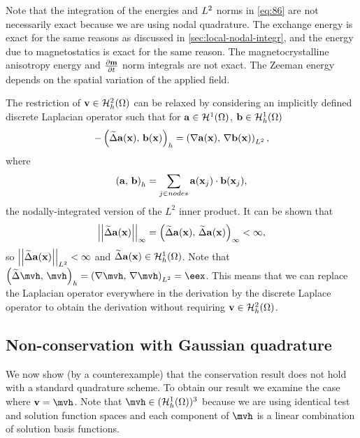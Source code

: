 Note that the integration of the energies and ${L^2}$ norms in \cref{eq:86} are not necessarily exact because we are using nodal quadrature.
The exchange energy is exact for the same reasons as discussed in \cref{sec:local-nodal-integr}, and the energy due to magnetostatics is exact for the same reason.
The magnetocrystalline anisotropy energy and $\frac{\partial \boldsymbol{\mathrm{m}}}{\partial t}$ norm integrals are not exact.
The Zeeman energy depends on the spatial variation of the applied field.

The restriction of $\boldsymbol{\mathrm{v}} \in \mathcal{H}_h^2(\Omega)$ can be relaxed by considering an implicitly defined discrete Laplacian operator such that for ${\boldsymbol{\mathrm{a}}} \in \mathcal{H}^1(\Omega)$, ${\boldsymbol{\mathrm{b}}} \in {\mathcal{H}^1_h(\Omega)}$
\begin{equation}
  -\left(\widetilde{\Delta} {\boldsymbol{\mathrm{a}}}(\boldsymbol{\mathrm{x}}),\, {\boldsymbol{\mathrm{b}}}(\boldsymbol{\mathrm{x}}) \right)_h = \left(\nabla {\boldsymbol{\mathrm{a}}}(\boldsymbol{\mathrm{x}}),\, \nabla {\boldsymbol{\mathrm{b}}}(\boldsymbol{\mathrm{x}}) \right)_{{L^2}},
\end{equation}
where
\begin{equation}
  \left({\boldsymbol{\mathrm{a}}},\, {\boldsymbol{\mathrm{b}}} \right)_h = \sum_{j \in nodes} {\boldsymbol{\mathrm{a}}}(\boldsymbol{\mathrm{x}}_j) \cdot {\boldsymbol{\mathrm{b}}}(\boldsymbol{\mathrm{x}}_j),
\end{equation}
\ie the nodally-integrated version of the $L^2$ inner product.
It can be shown \cite{Bartels2007} that
\begin{equation}
  \left| \left| \widetilde{\Delta} {\boldsymbol{\mathrm{a}}}(\boldsymbol{\mathrm{x}}) \right| \right|_{\infty} = \left(\widetilde{\Delta} {\boldsymbol{\mathrm{a}}}(\boldsymbol{\mathrm{x}}),\, \widetilde{\Delta} {\boldsymbol{\mathrm{a}}}(\boldsymbol{\mathrm{x}}) \right)_\infty < \infty,
\end{equation}
so $\left| \left| \widetilde{\Delta} {\boldsymbol{\mathrm{a}}}(\boldsymbol{\mathrm{x}}) \right| \right|_{{L^2}} < \infty$ and $\widetilde{\Delta} {\boldsymbol{\mathrm{a}}}(\boldsymbol{\mathrm{x}}) \in {\mathcal{H}^1_h(\Omega)}$.
Note that $\ip{\disclap \mvh}{\mvh}_h = \ltip{\grad \mvh}{\grad \mvh} = \eex$.
This means that we can replace the Laplacian operator everywhere in the derivation by the discrete Laplace operator to obtain the derivation without requiring $\boldsymbol{\mathrm{v}} \in \mathcal{H}_h^2(\Omega)$.

\subsection{Non-conservation with Gaussian quadrature}
\label{sec:non-cons-gaussian}

We now show (by a counterexample) that the conservation result does not hold with a standard quadrature scheme.
To obtain our result we examine the case where $\testv = \mvh$.
Note that $\mvh \in (\ts)^3$ because we are using identical test and solution function spaces and each component of $\mvh$ is a linear combination of solution basis functions.

